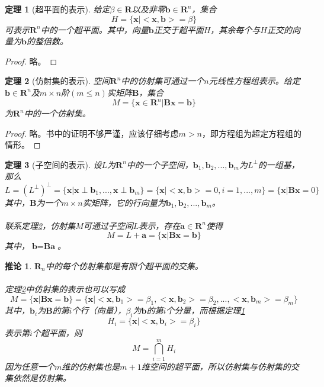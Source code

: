 \documentclass[a4paper,11pt,oneside]{article}
\newtheorem{theorem}{定理}[section]
\newtheorem{proof}{证明}[section]
\newtheorem{inference}{推论}[section]
\begin{document}
			\begin{theorem}[超平面的表示]
				\label{the:3}
				给定$\beta \in \textbf{R}$以及非零$\textbf{b} \in \textbf{R}^{n}$，集合
				$$H=\{\textbf{x}|<\textbf{x},\textbf{b}>=\beta\}$$
				可表示$\textbf{R}^{n}$中的一个超平面。其中，向量$\textbf{b}$正交于超平面$H$，其余每个与$H$正交的向量为$\textbf{b}$的整倍数。
			\end{theorem}
			\begin{proof}
				略。
			\end{proof}
			\begin{theorem}[仿射集的表示]
				\label{the:4}
				空间$\textbf{R}^{n}$中的仿射集可通过一个$n$元线性方程组表示。给定$\textbf{b}\in \textbf{R}^{n}$及$m\times n$阶$(m \leq n)$实矩阵$\textbf{B}$，集合
				$$M=\{\textbf{x}\in \textbf{R}^{n}|\textbf{B}\textbf{x}=\textbf{b}\}$$
				为$\textbf{R}^{n}$中的一个仿射集。
			\end{theorem}
			\begin{proof}
				略。书中的证明不够严谨，应该仔细考虑$m>n$，即方程组为超定方程组的情形。
			\end{proof}
			\begin{theorem}[子空间的表示]
				\label{the:5}
				设$L$为$\textbf{R}^{n}$中的一个子空间，$\textbf{b}_{1},\textbf{b}_{2},...,\textbf{b}_{m}$为$L^{\perp}$的一组基，那么
				$$L=(L^{\perp})^{\perp}=\{\textbf{x}|\textbf{x}\perp\textbf{b}_{1},...,\textbf{x}\perp\textbf{b}_{m}\}=\{\textbf{x}|<\textbf{x},\textbf{b}>=0,i=1,...,m\}=\{\textbf{x}|\textbf{B}\textbf{x}=0\}$$
				其中，$\textbf{B}$为一个$m\times n$实矩阵，它的行向量为$\textbf{b}_{1},\textbf{b}_{2},...,\textbf{b}_{m}$。\\
				\\
				联系定理\ref{the:4}，仿射集$M$可通过子空间$L$表示，存在$\textbf{a}\in \textbf{R}^{n}$使得
				$$M=L+\textbf{a}=\{\textbf{x}|\textbf{B}\textbf{x}=\textbf{b}\}$$
				其中，$\textbf{b}=\textbf{B}\textbf{a}$。
			\end{theorem}
			\begin{inference}
				$\textbf{R}_{n}$中的每个仿射集都是有限个超平面的交集。\\
				\\
				定理\ref{the:4}中仿射集的表示也可以写成
				$$M=\{\textbf{x}|\textbf{B}\textbf{x}=\textbf{b}\}=\{\textbf{x}|<\textbf{x},\textbf{b}_{1}>=\beta_{1},<\textbf{x},\textbf{b}_{2}>=\beta_{2},...,<\textbf{x},\textbf{b}_{m}>=\beta_{m}\}$$
				其中，$\textbf{b}_{i}$为$\textbf{B}$的第$i$个行（向量），$\beta_{i}$为$\textbf{b}$的第$i$个分量，而根据定理\ref{the:3}
				$$H_{i}=\{\textbf{x}|<\textbf{x},\textbf{b}_{i}>=\beta_{i}\}$$
				表示第$i$个超平面，则
				$$M=\bigcap_{i=1}^{m}H_{i}$$
				因为任意一个$m$维的仿射集也是$m+1$维空间的超平面，所以仿射集与仿射集的交集依然是仿射集。
			\end{inference}
\end{document}
